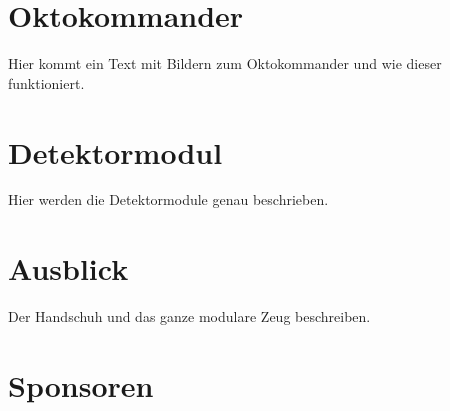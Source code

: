 \documentclass{sciposter}
\begin{document}
\begin{multicols}{3}

\section{Oktokommander}
Hier kommt ein Text mit Bildern zum Oktokommander und wie dieser funktioniert.

\section{Detektormodul}
Hier werden die Detektormodule genau beschrieben.

\section{Ausblick}
Der Handschuh und das ganze modulare Zeug beschreiben.

\section{Sponsoren}

\end{multicols}
\end{document}
